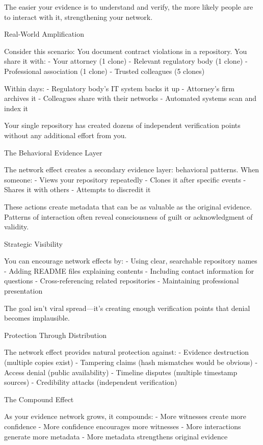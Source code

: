 The easier your evidence is to understand and verify, the more likely
people are to interact with it, strengthening your network.

Real-World Amplification

Consider this scenario: You document contract violations in a
repository. You share it with: - Your attorney (1 clone) - Relevant
regulatory body (1 clone) - Professional association (1 clone) - Trusted
colleagues (5 clones)

Within days: - Regulatory body's IT system backs it up - Attorney's firm
archives it - Colleagues share with their networks - Automated systems
scan and index it

Your single repository has created dozens of independent verification
points without any additional effort from you.

The Behavioral Evidence Layer

The network effect creates a secondary evidence layer: behavioral
patterns. When someone: - Views your repository repeatedly - Clones it
after specific events - Shares it with others - Attempts to discredit it

These actions create metadata that can be as valuable as the original
evidence. Patterns of interaction often reveal consciousness of guilt or
acknowledgment of validity.

Strategic Visibility

You can encourage network effects by: - Using clear, searchable
repository names - Adding README files explaining contents - Including
contact information for questions - Cross-referencing related
repositories - Maintaining professional presentation

The goal isn't viral spread---it's creating enough verification points
that denial becomes implausible.

Protection Through Distribution

The network effect provides natural protection against: - Evidence
destruction (multiple copies exist) - Tampering claims (hash mismatches
would be obvious) - Access denial (public availability) - Timeline
disputes (multiple timestamp sources) - Credibility attacks (independent
verification)

The Compound Effect

As your evidence network grows, it compounds: - More witnesses create
more confidence - More confidence encourages more witnesses - More
interactions generate more metadata - More metadata strengthens original
evidence

